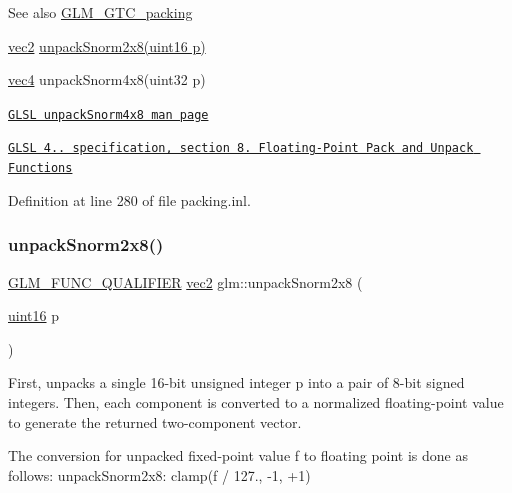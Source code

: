 \begin{DoxySeeAlso}{See also}
\hyperlink{group__gtc__packing}{G\+L\+M\+\_\+\+G\+T\+C\+\_\+packing} 

\hyperlink{group__core__types_gaa1618f51db67eaa145db101d8c8431d8}{vec2} \hyperlink{group__gtc__packing_ga27f30f0281b88e152b0895f5e2ead878}{unpack\+Snorm2x8(uint16 p)} 

\hyperlink{group__core__types_ga5881b1b022d7fd1b7218f5916532dd02}{vec4} unpack\+Snorm4x8(uint32 p) 

\href{http://www.opengl.org/sdk/docs/manglsl/xhtml/unpackSnorm4x8.xml}{\tt G\+L\+SL unpack\+Snorm4x8 man page} 

\href{http://www.opengl.org/registry/doc/GLSLangSpec.4.20.8.pdf}{\tt G\+L\+SL 4.. specification, section 8. Floating-\/\+Point Pack and Unpack Functions} 
\end{DoxySeeAlso}


Definition at line 280 of file packing.\+inl.

\mbox{\label{group__gtc__packing_ga27f30f0281b88e152b0895f5e2ead878}} 
\subsubsection{\texorpdfstring{unpack\+Snorm2x8()}{unpackSnorm2x8()}}
{\footnotesize\ttfamily \hyperlink{setup_8hpp_a33fdea6f91c5f834105f7415e2a64407}{G\+L\+M\+\_\+\+F\+U\+N\+C\+\_\+\+Q\+U\+A\+L\+I\+F\+I\+ER} \hyperlink{group__core__types_gaa1618f51db67eaa145db101d8c8431d8}{vec2} glm\+::unpack\+Snorm2x8 (\begin{DoxyParamCaption}\item[{\hyperlink{group__gtc__type__precision_gad8c2939e1fdd8e5828b31d95c52255d5}{uint16}}]{p }\end{DoxyParamCaption})}

First, unpacks a single 16-\/bit unsigned integer p into a pair of 8-\/bit signed integers. Then, each component is converted to a normalized floating-\/point value to generate the returned two-\/component vector.

The conversion for unpacked fixed-\/point value f to floating point is done as follows\+: unpack\+Snorm2x8\+: clamp(f / 127., -\/1, +1)


